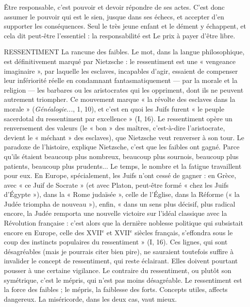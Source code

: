 Être responsable, c’est pouvoir et devoir répondre de ses actes. C’est donc
assumer le pouvoir qui est le sien, jusque dans ses échecs, et accepter d’en supporter
les conséquences. Seul le très jeune enfant et le dément y échappent, et
cela dit peut-être l'essentiel : la responsabilité est Le prix à payer d’être libre.

RESSENTIMENT La rancune des faibles. Le mot, dans la langue philosophique,
est définitivement marqué par Nietzsche : le ressentiment
est une « vengeance imaginaire », par laquelle les esclaves, incapables
d’agir, essaient de compenser leur infériorité réelle en condamnant fantasmatiquement
— par la morale et la religion — les barbares ou les aristocrates qui les
oppriment, dont ils ne peuvent autrement triompher. Ce mouvement marque
« la révolte des esclaves dans la morale » ({\it Généalogie...}, 1, 10), et c’est en quoi
les Juifs furent « le peuple sacerdotal du ressentiment par excellence » (I, 16).
Le ressentiment opère un renversement des valeurs (le « bon » des maîtres,
c’est-à-dire l’aristocrate, devient le « méchant » des esclaves), que Nietzsche
veut renverser à son tour. Le paradoxe de l’histoire, explique Nietzsche, c’est
que les faibles ont gagné. Parce qu’ils étaient beaucoup plus nombreux, beaucoup
plus sournois, beaucoup plus patients, beaucoup plus prudents... Le
temps, le nombre et la fatigue travaillent pour eux. En Europe, spécialement,
les Juifs n’ont cessé de gagner : en Grèce, avec « ce Juif de Socrate » (et avec
Platon, peut-être formé « chez les Juifs d'Égypte »), dans la « Rome judaïsée »,
celle de l'Église, dans la Réforme (« la Judée triompha de nouveau »), enfin,
« dans un sens plus décisif, plus radical encore, la Judée remporta une nouvelle
victoire sur l’idéal classique avec la Révolution française : c’est alors que la
dernière noblesse politique qui subsistait encore en Europe, celle des {\footnotesize XVII$^\text{e}$} et
{\footnotesize XVII$^\text{e}$} siècles français, s’effondra sous le coup des instincts populaires du ressentiment »
(I, 16). Ces lignes, qui sont désagréables (mais je pourrais citer bien
pire), ne sauraient toutefois suffire à invalider le concept de ressentiment, qui
reste éclairant. Elles doivent pourtant pousser à une certaine vigilance. Le
contraire du ressentiment, ou plutôt son symétrique, c’est le mépris, qui n’est
pas moins désagréable. Le ressentiment est la force des faibles ; le mépris, la faiblesse
des forts. Concepts utiles, affects dangereux. La miséricorde, dans les
deux cas, vaut mieux.

